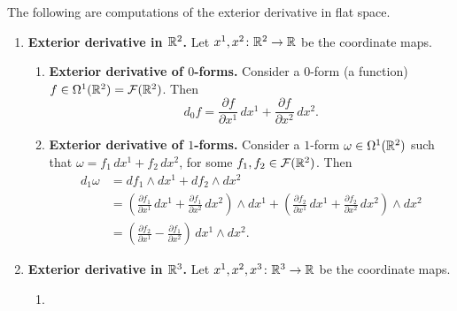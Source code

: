 \begin{example}
  The following are computations of the exterior derivative in flat space.
  \begin{enumerate}
    \item
      \textbf{Exterior derivative in $\mathbb{R}^2$.}
      Let $x^1, x^2 \colon \mathbb{R}^2 \to \mathbb{R}$ be the coordinate maps.
      \begin{enumerate}
        \item
          \textbf{Exterior derivative of $0$-forms.}
          Consider a $0$-form (a function)
          $f \in \Omega^1(\mathbb{R}^2) = \mathcal{F}(\mathbb{R}^2)$.
          Then
          \begin{equation}
            d_0 f
            = \frac{\partial f}{\partial x^1}\, d x^1
            + \frac{\partial f}{\partial x^2}\, d x^2.
          \end{equation}
        \item
          \textbf{Exterior derivative of $1$-forms.}
          Consider a $1$-form $\omega \in \Omega^1(\mathbb{R}^2)$ such that
          $\omega = f_1\, d x^1 + f_2\, d x^2$,
          for some $f_1, f_2 \in \mathcal{F}(\mathbb{R}^2)$.
          Then
          \begin{equation}
            \begin{split}
              d_1 \omega
              & = d f_1 \wedge d x^1 + d f_2 \wedge d x^2 \\
              & =
                \left(
                  \frac{\partial f_1}{\partial x^1}\, d x^1
                  + \frac{\partial f_1}{\partial x^2}\, d x^2
                \right)
                \wedge d x^1
                +
                \left(
                  \frac{\partial f_2}{\partial x^1}\, d x^1
                  + \frac{\partial f_2}{\partial x^2}\, d x^2
                \right)
                \wedge d x^2 \\
              & =
                \left(
                  \frac{\partial f_2}{\partial x^1}
                  - \frac{\partial f_1}{\partial x^2}
                \right)\,
                d x^1 \wedge d x^2.
            \end{split}
          \end{equation}
      \end{enumerate}
    \item
      \textbf{Exterior derivative in $\mathbb{R}^3$.}
      Let $x^1, x^2, x^3 \colon \mathbb{R}^3 \to \mathbb{R}$ be the coordinate maps.
      \begin{enumerate}
        \item

\end{enumerate}
\end{enumerate}
\end{example}
